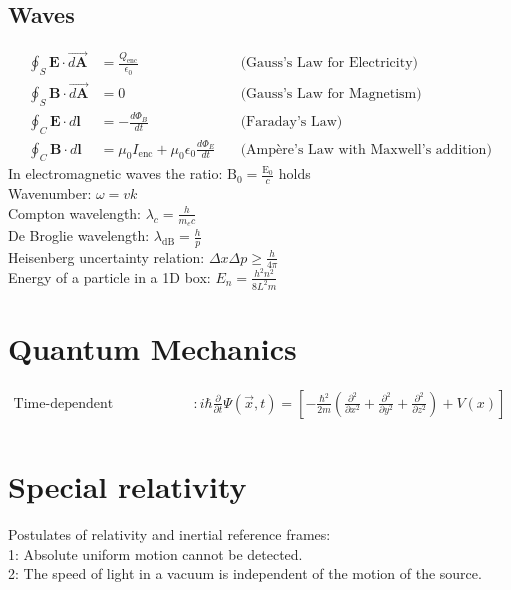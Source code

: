 \documentclass[12pt,a4paper]{article}
\begin{document}
	\subsection*{Waves}
	\begin{align}
		\oint_{S} \mathbf{E} \cdot \vec{d\mathbf{A}} &= \frac{Q_{\text{enc}}}{\epsilon_0} \quad &\text{(Gauss's Law for Electricity)} \\
		\oint_{S} \mathbf{B} \cdot \vec{d\mathbf{A}}  &= 0 \quad &\text{(Gauss's Law for Magnetism)} \\
		\oint_{C} \mathbf{E} \cdot d\mathbf{l} &= -\frac{d\Phi_{B}}{dt} \quad &\text{(Faraday's Law)} \\
		\oint_{C} \mathbf{B} \cdot d\mathbf{l} &= \mu_0 I_{\text{enc}} + \mu_0 \epsilon_0 \frac{d\Phi_{E}}{dt} \quad &\text{(Ampère's Law with Maxwell's addition)}
	\end{align}
	In electromagnetic waves the ratio: $\text{B}_0=\frac{\text{E}_0}{c}$ holds\\
	Wavenumber: $\omega = v k $\\
	Compton wavelength: $\lambda_c = \frac{h}{m_e c}$\\
	De Broglie wavelength: $\lambda_{\text{dB}} = \frac{h}{p}$\\
	Heisenberg uncertainty relation: $\Delta x \Delta p \geq \frac{h}{4\pi}$\\
	Energy of a particle in a 1D box: $E_n = \frac{h^2 n^2}{8L^2m}$\\
	
	
	
	\section*{Quantum Mechanics}
	\begin{align*}
		\text{Time-dependent Schrodinger's Equation} & : i\hbar \frac{\partial}{\partial t} \Psi (\vec{x}, t) = [-\frac{\hbar^2}{2m}(\frac{\partial ^2}{\partial x^2} + \frac{\partial ^2}{\partial y ^2} + \frac{\partial^2}{\partial z^2}) + V(x)] \\
	\end{align*}
	
	\section*{Special relativity}
	Postulates of relativity and inertial reference frames:\\
	1: Absolute uniform motion cannot be detected.\\
	2: The speed of light in a vacuum is independent of the motion of the source.\\
	
\end{document}
